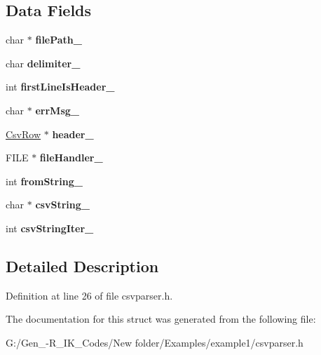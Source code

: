 \subsection*{Data Fields}
\begin{DoxyCompactItemize}
\item 
\mbox{\label{struct_csv_parser_af8e15bff530b2aa132ee1ae6d9c55b4e}} 
char $\ast$ {\bfseries file\+Path\+\_\+}
\item 
\mbox{\label{struct_csv_parser_a26fdea54e16baaffe0ed9119c0e9d4e5}} 
char {\bfseries delimiter\+\_\+}
\item 
\mbox{\label{struct_csv_parser_ab6121214d4ead9cbe96afd9a920f92c7}} 
int {\bfseries first\+Line\+Is\+Header\+\_\+}
\item 
\mbox{\label{struct_csv_parser_a3d80c0e7b25466b0ce505e419d93c6bf}} 
char $\ast$ {\bfseries err\+Msg\+\_\+}
\item 
\mbox{\label{struct_csv_parser_a2fee9340b04585bf3c349c28dbbe04bb}} 
\hyperlink{struct_csv_row}{Csv\+Row} $\ast$ {\bfseries header\+\_\+}
\item 
\mbox{\label{struct_csv_parser_a25e2f4799c8893469b28666282accc20}} 
F\+I\+LE $\ast$ {\bfseries file\+Handler\+\_\+}
\item 
\mbox{\label{struct_csv_parser_a0e7996f7fb2622fb38f2f292cb04ce8b}} 
int {\bfseries from\+String\+\_\+}
\item 
\mbox{\label{struct_csv_parser_a45eb545400de372945c3b5465ba0a5f0}} 
char $\ast$ {\bfseries csv\+String\+\_\+}
\item 
\mbox{\label{struct_csv_parser_a0b405b96a2b250825fc5a185ce037603}} 
int {\bfseries csv\+String\+Iter\+\_\+}
\end{DoxyCompactItemize}


\subsection{Detailed Description}


Definition at line 26 of file csvparser.\+h.



The documentation for this struct was generated from the following file\+:\begin{DoxyCompactItemize}
\item 
G\+:/\+Gen\+\_-\/\+R\+\_\+\+I\+K\+\_\+\+Codes/\+New folder/\+Examples/example1/csvparser.\+h\end{DoxyCompactItemize}
